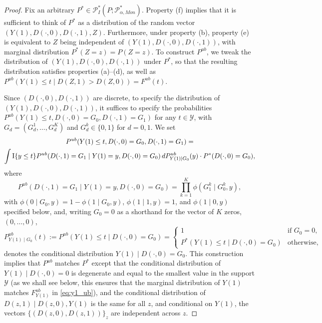 \documentclass[12pt]{article}%
\theoremstyle{definition}
\newcommand\1{\operatorname{I}\indicatorfence}
\begin{document}
\begin{appendices}
\begin{proof}
    Fix an arbitrary
  $P^{*}\in\mathcal{P}^*_{I}(P; \mathcal{P}^{*}_{\alpha, Mon})$. Property (f) implies that it is sufficient to think of $P^{*}$ as a
  distribution of the random vector $(Y(1), D(\cdot, 0), D(\cdot, 1), Z)$.
  Furthermore, under property (b), property (e) is equivalent to $Z$ being
  independent of $(Y(1), D(\cdot, 0), D(\cdot, 1))$, with marginal distribution
  $P^{*}(Z=z)=P(Z=z)$. To construct $P^{ub}$, we tweak the distribution of
  $(Y(1), D(\cdot, 0), D(\cdot, 1))$ under $P^{*}$, so that the resulting
  distribution satisfies properties (a)--(d), as well as
  $P^{ub}(Y(1) \leq t\mid D(Z,1)>D(Z,0))= F^{ub}(t)$.

  Since $(D(\cdot, 0), D(\cdot, 1))$ are discrete, to specify the distribution
  of $(Y(1), D(\cdot, 0), D(\cdot, 1))$, it suffices to specify the
  probabilities $P^{ub}(Y(1)\leq t, D(\cdot, 0)= G_{0}, D(\cdot, 1)= G_{1})$ for
  any $t\in\mathcal{Y}$, with $G_{d}=(G_{d}^{1}, \dotsc, G_{d}^{K})$ and
  $G_{d}^{k}\in \{0,1\}$ for $d=0,1$. We set
  \begin{multline*}
    P^{ub}(Y(1)\leq t, D(\cdot, 0)= G_{0}, D(\cdot, 1)= G_{1})=\\
    \int \1{y\leq t}P^{ub}(D(\cdot, 1)= G_{1}\mid Y(1)=y,D(\cdot, 0)= G_{0})\, d P^{ub}_{Y(1)\mid G_{0}}(y)\cdot
    P^{*}(D(\cdot, 0)=G_{0}),
  \end{multline*}
  where
  \begin{equation*}
    P^{ub}(D(\cdot, 1)= G_{1}\mid Y(1)=y, D(\cdot, 0)= G_{0})
    =\prod_{k=1}^{K}\phi(G_{1}^{k}\mid G_{0}^{k}, y),
  \end{equation*}
  with $\phi(0\mid G_{0},y)=1-\phi(1\mid G_{0},y)$, $\phi(1\mid 1,y)=1$, and
  $\phi(1\mid 0,y)$ specified below, and, writing $G_0=0$ as a shorthand for the
  vector of $K$ zeros, $(0, \dotsc, 0)$,
  \begin{equation*}
    P^{ub}_{Y(1)\mid G_{0}}(t):=
    P^{ub}(Y(1)\leq t\mid D(\cdot, 0)= G_{0})=
    \begin{cases}
      1 & \text{if $G_{0}=0$,}\\
      P^{*}(Y(1)\leq t\mid D(\cdot, 0)= G_{0}) & \text{otherwise,}
    \end{cases}
  \end{equation*}
  denotes the conditional distribution $Y(1)\mid D(\cdot, 0)= G_{0}$. This
  construction implies that $P^{ub}$ matches $P^{*}$ except that the conditional
  distribution of $Y(1)\mid D(\cdot,0)=0$ is degenerate and equal to the
  smallest value in the support $\mathcal{Y}$ (as we shall see below, this
  ensures that the marginal distribution of $Y(1)$ matches $F^{ub}_{Y(1)}$ in
  \cref{eq:y1_ub}), and the conditional distribution of
  $D(z,1)\mid D(z,0), Y(1)$ is the same for all $z$, and conditional on $Y(1)$,
  the vectors $\{(D(z,0), D(z,1))\}_z$ are independent across $z$.


\end{proof}
\end{appendices}
\end{document}
